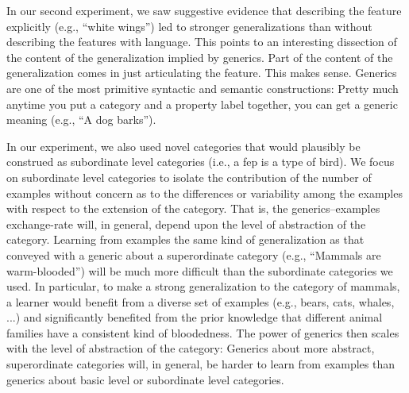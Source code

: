 \documentclass[10pt,letterpaper]{article}
\begin{document}
In our second experiment, we saw suggestive evidence that describing the feature explicitly (e.g., ``white wings'') led to stronger generalizations than without describing the features with language. 
This points to an interesting dissection of the content of the generalization implied by generics. Part of the content of the generalization comes in just articulating the feature. This makes sense.  Generics are one of the most primitive syntactic and semantic constructions: Pretty much anytime you put a category and a property label together, you can get a generic meaning (e.g., ``A dog barks''). 

In our experiment, we also used novel categories that would plausibly be construed as subordinate level categories (i.e., a fep is a type of bird).
We focus on subordinate level categories to isolate the contribution of the number of examples without concern as to the differences or variability among the examples with respect to the extension of the category.
That is, the generics--examples exchange-rate will, in general, depend upon the level of abstraction of the category. 
Learning from examples the same kind of generalization as that conveyed with a generic about a superordinate category (e.g., ``Mammals are warm-blooded'') will be much more difficult than the subordinate categories we used. 
In particular, to make a strong generalization to the category of mammals, a learner would benefit from a diverse set of examples (e.g., bears, cats, whales, ...) and significantly benefited from the prior knowledge that different animal families have a consistent kind of bloodedness. 
The power of generics then scales with the level of abstraction of the category: Generics about more abstract, superordinate categories will, in general, be harder to learn from examples than generics about basic level or subordinate level categories. 
\end{document}
